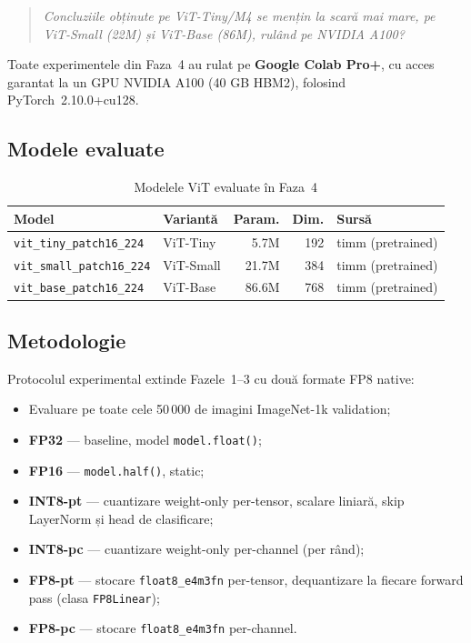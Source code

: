 \documentclass[12pt,a4paper]{article}
\begin{document}
\begin{quote}
\textit{Concluziile obținute pe ViT-Tiny/M4 se mențin la scară mai mare,
pe ViT-Small (22M) și ViT-Base (86M), rulând pe NVIDIA A100?}
\end{quote}

Toate experimentele din Faza~4 au rulat pe \textbf{Google Colab Pro+},
cu acces garantat la un GPU NVIDIA A100 (40 GB HBM2), folosind
PyTorch~2.10.0+cu128.

\subsection{Modele evaluate}

\begin{table}[H]
  \centering
  \caption{Modelele ViT evaluate în Faza~4}
  \small
  \begin{tabular}{p{5.2cm}lrrl}
    \toprule
    \textbf{Model} & \textbf{Variantă} & \textbf{Param.} &
    \textbf{Dim.} & \textbf{Sursă} \\
    \midrule
    \texttt{vit\_tiny\_patch16\_224}  & ViT-Tiny  &  5.7M & 192 &
      timm (pretrained) \\
    \texttt{vit\_small\_patch16\_224} & ViT-Small & 21.7M & 384 &
      timm (pretrained) \\
    \texttt{vit\_base\_patch16\_224}  & ViT-Base  & 86.6M & 768 &
      timm (pretrained) \\
    \bottomrule
  \end{tabular}
  \label{tab:models}
\end{table}

\subsection{Metodologie}

Protocolul experimental extinde Fazele~1--3 cu două formate FP8 native:
\begin{itemize}
  \item Evaluare pe toate cele 50\,000 de imagini ImageNet-1k validation;
  \item \textbf{FP32} — baseline, model \texttt{model.float()};
  \item \textbf{FP16} — \texttt{model.half()}, static;
  \item \textbf{INT8-pt} — cuantizare weight-only per-tensor, scalare liniară,
    skip LayerNorm și head de clasificare;
  \item \textbf{INT8-pc} — cuantizare weight-only per-channel (per rând);
  \item \textbf{FP8-pt} — stocare \texttt{float8\_e4m3fn} per-tensor,
    dequantizare la fiecare forward pass (clasa \texttt{FP8Linear});
  \item \textbf{FP8-pc} — stocare \texttt{float8\_e4m3fn} per-channel.
\end{itemize}
\end{document}

